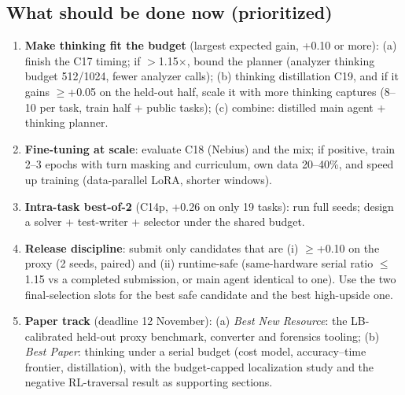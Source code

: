 \subsection{What should be done now (prioritized)}
\begin{enumerate}
\item \textbf{Make thinking fit the budget} (largest expected gain, +0.10 or more):
 (a) finish the C17 timing; if $>$1.15$\times$, bound the planner (analyzer thinking budget 512/1024, fewer analyzer calls);
 (b) thinking distillation C19, and if it gains $\geq$+0.05 on the held-out half, scale it with more thinking captures (8--10 per
 task, train half + public tasks); (c) combine: distilled main agent + thinking planner.
\item \textbf{Fine-tuning at scale}: evaluate C18 (Nebius) and the mix; if positive, train 2--3 epochs with turn masking and
curriculum, own data 20--40\%, and speed up training (data-parallel LoRA, shorter windows).
\item \textbf{Intra-task best-of-2} (C14p, +0.26 on only 19 tasks): run full seeds; design a solver + test-writer + selector
 under the shared budget.
\item \textbf{Release discipline}: submit only candidates that are (i) $\geq$+0.10 on the proxy (2 seeds, paired) and (ii) runtime-safe
(same-hardware serial ratio $\leq$1.15 vs a completed submission, or main agent identical to one). Use the two final-selection slots
for the best safe candidate and the best high-upside one.
\item \textbf{Paper track} (deadline 12 November): (a) \emph{Best New Resource}: the LB-calibrated held-out proxy benchmark,
converter and forensics tooling; (b) \emph{Best Paper}: thinking under a serial budget (cost model, accuracy--time frontier,
distillation), with the budget-capped localization study and the negative RL-traversal result as supporting sections.
\end{enumerate}
